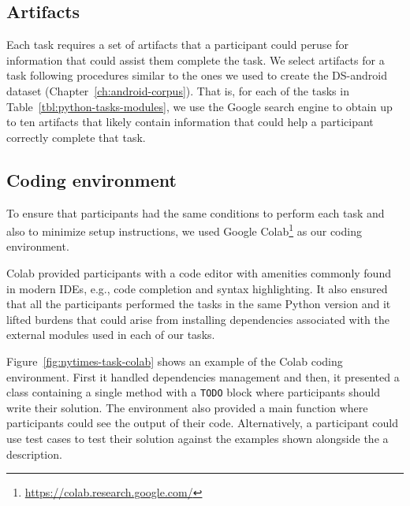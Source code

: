 







\subsection{Artifacts}
\label{cp6:experiment-artifacts}


Each task requires a set of artifacts that a participant could peruse for information that could assist them complete the task.
We select artifacts for a task following procedures similar to the ones we used to create the \acs{DS-android} dataset (Chapter~\ref{ch:android-corpus}). 
That is, for each of the tasks in Table~\ref{tbl:python-tasks-modules}, we use the Google search engine to obtain up to ten artifacts that likely contain 
information that could help a participant correctly complete that task. 







\subsection{Coding environment}
\label{cp6:coding-environment}






To ensure that participants had the same conditions to perform each task
and also to minimize setup instructions, we used Google Colab\footnote{\url{https://colab.research.google.com/}} as our coding environment. 






Colab provided participants with a code editor with amenities commonly found in modern IDEs, e.g., code completion and syntax highlighting. It also ensured that all the participants 
performed the tasks in the same Python version and it lifted 
burdens that could arise from installing dependencies associated with the external modules used in each of our tasks. 



Figure~\ref{fig:nytimes-task-colab} shows an example of the Colab coding environment. 
First it handled dependencies management and then, 
it presented a class containing a single method with a \texttt{TODO} block where 
participants should write their solution. 
The environment also provided a main function where participants could see the output
of their code. Alternatively, a participant could use test cases to test their solution
against the examples shown alongside the a description.





